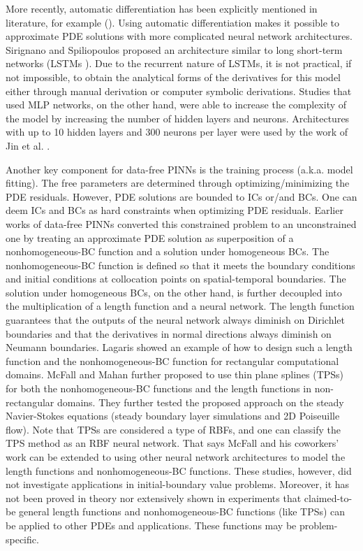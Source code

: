 More recently, automatic differentiation has been explicitly mentioned in literature, for example (\cite{berg_unified_2018,sirignano_dgm:_2018,dockhorn_discussion_2019,raissi_physics-informed_2017,raissi_physics-informed_2019,jin_nsfnets_2020,lu_deepxde:_2021,cai_physics-informed_2021}).
Using automatic differentiation makes it possible to approximate PDE solutions with more complicated neural network architectures.
Sirignano and Spiliopoulos \cite{sirignano_dgm:_2018} proposed an architecture similar to long short-term networks (LSTMs \cite{hochreiter_long_1997}).
Due to the recurrent nature of LSTMs, it is not practical, if not impossible, to obtain the analytical forms of the derivatives for this model either through manual derivation or computer symbolic derivations.
Studies that used MLP networks, on the other hand, were able to increase the complexity of the model by increasing the number of hidden layers and neurons.
Architectures with up to 10 hidden layers and 300 neurons per layer were used by the work of Jin et al. \cite{jin_nsfnets_2020}.

Another key component for data-free PINNs is the training process (a.k.a. model fitting).
The free parameters are determined through optimizing/minimizing the PDE residuals.
However, PDE solutions are bounded to ICs or/and BCs.
One can deem ICs and BCs as hard constraints when optimizing PDE residuals.
Earlier works of data-free PINNs converted this constrained problem to an unconstrained one by treating an approximate PDE solution as superposition of a nonhomogeneous-BC function and a solution under homogeneous BCs.
The nonhomogeneous-BC function is defined so that it meets the boundary conditions and initial conditions at collocation points on spatial-temporal boundaries.
The solution under homogeneous BCs, on the other hand, is further decoupled into the multiplication of a length function and a neural network.
The length function guarantees that the outputs of the neural network always diminish on Dirichlet boundaries and that the derivatives in normal directions always diminish on Neumann boundaries.
Lagaris \cite{lagaris_artificial_1998} showed an example of how to design such a length function and the nonhomogeneous-BC function for rectangular computational domains.
McFall and Mahan \cite{McFall2009} further proposed to use thin plane splines (TPSs) for both the nonhomogeneous-BC functions and the length functions in non-rectangular domains.
They further tested the proposed approach on the steady Navier-Stokes equations (steady boundary layer simulations and 2D Poiseuille flow). 
Note that TPSs are considered a type of RBFs, and one can classify the TPS method as an RBF neural network.
That says McFall and his coworkers' work can be extended to using other neural network architectures to model the length functions and nonhomogeneous-BC functions.
These studies, however, did not investigate applications in initial-boundary value problems.
Moreover, it has not been proved in theory nor extensively shown in experiments that claimed-to-be general length functions and nonhomogeneous-BC functions (like TPSs) can be applied to other PDEs and applications.
These functions may be problem-specific.

